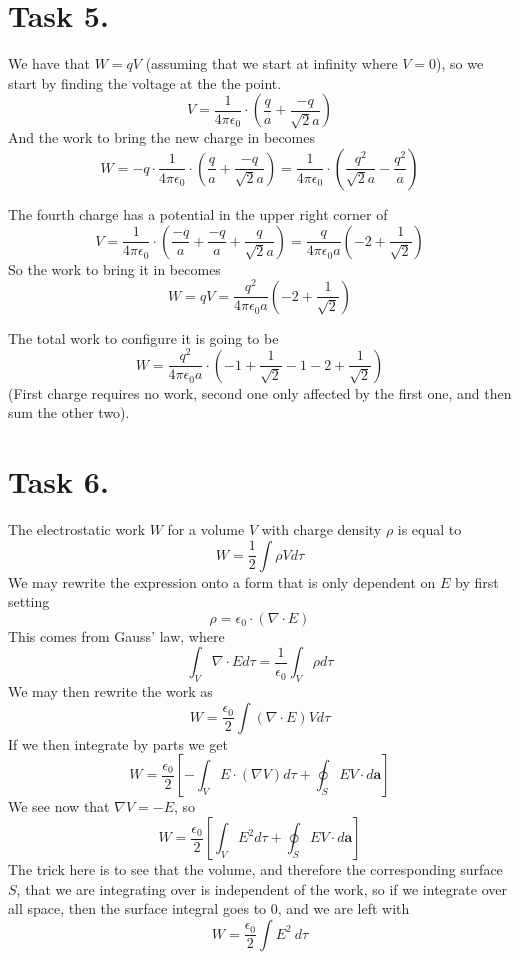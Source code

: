 \documentclass[a4paper,11pt]{article}
\begin{document}
\section*{Task 5.}
\begin{alphalist}
    \item We have that $W = qV$ (assuming that we start at infinity where $V = 0$), so we start by finding the voltage at the the point.
        \[
            V = \frac{1}{4\pi\epsilon_0} \cdot \left(\frac{q}{a} + \frac{-q}{\sqrt{2}a}\right)
        \]
        And the work to bring the new charge in becomes
        \[
            W = -q \cdot \frac{1}{4\pi\epsilon_0} \cdot \left(\frac{q}{a} + \frac{-q}{\sqrt{2}a}\right) = \frac{1}{4\pi\epsilon_0} \cdot \left(\frac{q^2}{\sqrt{2}a} - \frac{q^2}{a}\right)
        \]
    \item The fourth charge has a potential in the upper right corner of
        \[
            V = \frac{1}{4\pi\epsilon_0} \cdot \left(\frac{-q}{a} + \frac{-q}{a} + \frac{q}{\sqrt{2}a} \right) = \frac{q}{4\pi\epsilon_0 a}\left(-2 + \frac{1}{\sqrt{2}}\right)
        \]
        So the work to bring it in becomes
        \[
            W = qV = \frac{q^2}{4\pi\epsilon_0 a}\left(-2 + \frac{1}{\sqrt{2}}\right)
        \]
    \item The total work to configure it is going to be
        \[
            W = \frac{q^2}{4\pi\epsilon_0 a} \cdot \left(-1 + \frac{1}{\sqrt{2}} - 1 - 2 + \frac{1}{\sqrt{2}}\right)
        \]
        (First charge requires no work, second one only affected by the first one, and then sum the other two).
\end{alphalist}

\section*{Task 6.}
The electrostatic work $W$ for a volume $V$ with charge density $\rho$ is equal to
\[
    W = \frac{1}{2}\int \rho V d\tau
\]
We may rewrite the expression onto a form that is only dependent on $E$ by first setting
\[
    \rho = \epsilon_0 \cdot (\nabla \cdot E)
\]
This comes from Gauss' law, where 
\[
    \int_{V} \nabla \cdot E d\tau = \frac{1}{\epsilon_0}\int_{V} \rho d\tau
\]
We may then rewrite the work as
\[
    W = \frac{\epsilon_0}{2} \int (\nabla \cdot E) V d\tau
\]
If we then integrate by parts we get
\[
    W = \frac{\epsilon_0}{2} \left[ -\int_V E \cdot (\nabla V) d\tau + \oint_{S} EV \cdot d\mathbf{a} \right]
\]
We see now that $\nabla V = -E$, so
\[
    W = \frac{\epsilon_0}{2} \left[ \int_{V} E^2 d\tau + \oint_{S} EV \cdot d\mathbf{a} \right]
\]
The trick here is to see that the volume, and therefore the corresponding surface $S$, that we are integrating
over is independent of the work, so if we integrate over all space, then the surface integral goes to 0, and we are left with
\[
    \boxed{W = \frac{\epsilon_0}{2} \int E^2 \:d\tau}
\]
\end{document}
